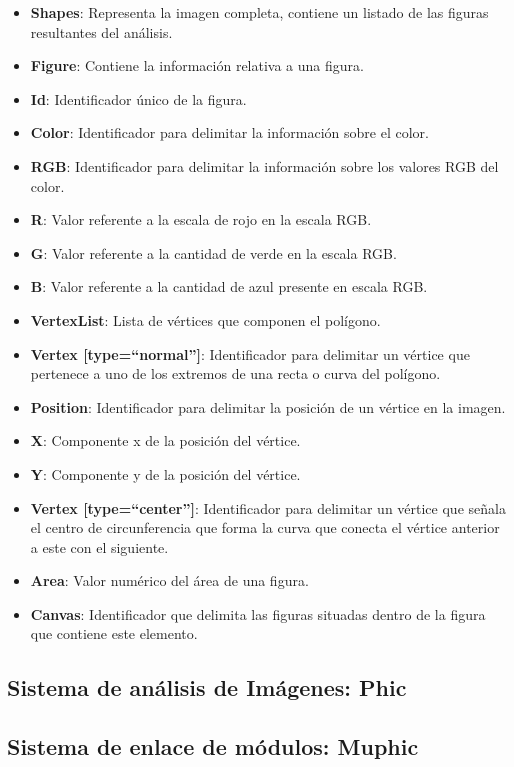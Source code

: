 \begin{itemize}
\item \textbf{Shapes}: Representa la imagen completa, contiene un listado de las figuras resultantes del análisis.
\item \textbf{Figure}: Contiene la información relativa a una figura.
\item \textbf{Id}: Identificador único de la figura.
\item \textbf{Color}: Identificador para delimitar la información sobre el color.
\item \textbf {RGB}: Identificador para delimitar la información sobre los valores RGB del color.
\item \textbf{R}: Valor referente a la escala de rojo en la escala RGB.
\item \textbf{G}: Valor referente a la cantidad de verde en la escala RGB.
\item \textbf{B}: Valor referente a la cantidad de azul presente en escala RGB.
\item \textbf{VertexList}: Lista de vértices que componen el polígono.
\item \textbf{Vertex [type=``normal'']}: Identificador para delimitar un vértice que pertenece a uno de los extremos de una recta o curva del polígono.
\item \textbf{Position}: Identificador para delimitar la posición de un vértice en la imagen.
\item \textbf{X}: Componente x de la posición del vértice.
\item \textbf{Y}: Componente y de la posición del vértice.
\item \textbf{Vertex [type=``center'']}: Identificador para delimitar un vértice que señala el centro de circunferencia que forma la curva que conecta el vértice anterior a este con el siguiente.
\item \textbf{Area}: Valor numérico del área de una figura.
\item \textbf{Canvas}: Identificador que delimita las figuras situadas dentro de la figura que contiene este elemento. 
\end{itemize}


\subsection{Sistema de análisis de Imágenes: Phic}


\subsection{Sistema de enlace de módulos: Muphic}


